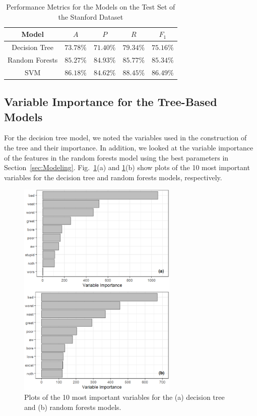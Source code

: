 \documentclass[conference]{IEEEtran}
\begin{document}
\begin{table}[tbp]
    \caption{Performance Metrics for the Models on the Test Set of the Stanford Dataset}
    \begin{center}
    \begin{tabular}{c|cccc}
    \hline
    \textbf{Model} & \(A\) & \(P\) & \(R\) & \(F_1\) \\
    \hline
    Decision Tree & \(73.78\%\) & \(71.40\%\) & \(79.34\%\) & \(75.16\%\) \\
    Random Forests & \(85.27\%\) & \(84.93\%\) & \(85.77\%\) & \(85.34\%\) \\
    SVM & \(86.18\%\) & \(84.62\%\) & \(88.45\%\) & \(86.49\%\) \\
    \hline
    \end{tabular}
    \label{tab:Perf}
    \end{center}
\end{table}

\subsection{Variable Importance for the Tree-Based Models}\label{sec:VarImp}
For the decision tree model, we noted the variables used in the construction of the tree and their importance. In addition, we looked at the variable importance of the features in the random forests model using the best parameters in Section~\ref{sec:Modeling}. Fig.~\ref{fig:VarImp}(a) and \ref{fig:VarImp}(b) show plots of the 10 most important variables for the decision tree and random forests models, respectively.

\begin{figure}[tbp]
    \centerline{\includegraphics[width=3in]{figures/VarImp.eps}}
    \caption{Plots of the 10 most important variables for the (a) decision tree and (b) random forests models.}
    \label{fig:VarImp}
\end{figure}
\end{document}
